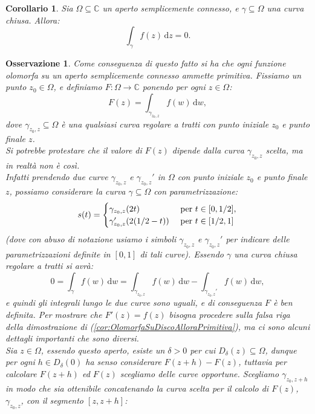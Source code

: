 \documentclass[11pt]{book}
\theoremstyle{Definizione}
\theoremstyle{TeoremaProposizioneLemmaCorollarioCongettura}
\newtheorem{mycor}[myteo]{Corollario}
\theoremstyle{OsservazioneNotaEsempio}
\newtheorem{myobs}{Osservazione}[section]
\newcommand{\C}{\mathbb{C}}
\newcommand{\Disc}[3][]{D^{#1}_{{#2}}({#3})}
\renewcommand{\d}{\mathrm{d}}
\newcommand{\dz}{\,\d z}
\newcommand{\dw}{\,\d w}
\begin{document}
\begin{boxoss}
\begin{mycor}\label{cor:CorollarioTeoremaDiCauchy}
Sia $\Omega\subseteq \C$ un aperto semplicemente connesso, e $\gamma\subseteq \Omega$ una curva chiusa. Allora:
$$
\int_\gamma f(z)\dz = 0.
$$
\end{mycor}
\end{boxoss}
\begin{myobs}
Come conseguenza di questo fatto si ha che ogni funzione olomorfa su un aperto semplicemente connesso ammette primitiva.
Fissiamo un punto $z_0\in \Omega$, e definiamo $F:\Omega\longrightarrow \C$ ponendo per ogni $z\in \Omega$:
$$
F(z) = \int_{\gamma_{z_0,z}} f(w)\dw,
$$
dove $\gamma_{z_0,z}\subseteq \Omega$ è una qualsiasi curva regolare a tratti con punto iniziale $z_0$ e punto finale $z$.\\
Si potrebbe protestare che il valore di $F(z)$ dipende dalla curva $\gamma_{z_0,z}$ scelta, ma in realtà non è così.\\
Infatti prendendo due curve $\gamma_{z_0,z}$ e $\gamma_{z_0,z}'$ in $\Omega$ con punto iniziale $z_0$ e punto finale $z$, possiamo considerare la curva $\gamma\subseteq \Omega$ con parametrizzazione:
$$
s(t) = \begin{cases}
\gamma_{z_0,z}(2t) &\textup{ per }t\in [0,1/2],\\
\gamma_{z_0,z}'(2(1/2-t)) &\textup{ per }t\in [1/2,1]
\end{cases}
$$
(dove con abuso di notazione usiamo i simboli $\gamma_{z_0,z}$ e $\gamma_{z_0,z}'$ per indicare delle parametrizzazioni definite in $[0,1]$ di tali curve). Essendo $\gamma$ una curva chiusa regolare a tratti si avrà:
$$
0 = \int_\gamma f(w)\dw = \int_{\gamma_{z_0,z}} f(w)\dw - \int_{\gamma_{z_0,z}'} f(w)\dw,
$$
e quindi gli integrali lungo le due curve sono uguali, e di conseguenza $F$ è ben definita. Per mostrare che $F'(z) = f(z)$ bisogna procedere sulla falsa riga della dimostrazione di (\ref{cor:OlomorfaSuDiscoAlloraPrimitiva}), ma ci sono alcuni dettagli importanti che sono diversi.\\
Sia $z\in \Omega$, essendo questo aperto, esiste un $\delta > 0$ per cui $\Disc{\delta}{z}\subseteq \Omega$, dunque per ogni $h\in \Disc{\delta}{0}$ ha senso considerare $F(z+h)-F(z)$, tuttavia per calcolare $F(z+h)$ ed $F(z)$ scegliamo delle curve opportune. Scegliamo $\gamma_{z_0,z+h}$ in modo che sia ottenibile concatenando la curva scelta per il calcolo di $F(z)$, $\gamma_{z_0,z}$, con il segmento $[z,z+h]$:
\begin{center}

\end{center}
\end{myobs}
\end{document}
